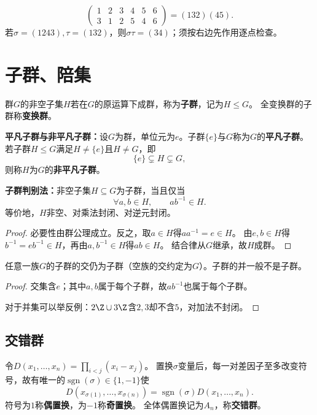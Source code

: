 \begin{example}
\[
\begin{pmatrix}1&2&3&4&5&6\\3&1&2&5&4&6\end{pmatrix}=(132)(45).
\]
若$\sigma=(1243),\tau=(132)$，则$\sigma\tau=(34)$；须按右边先作用逐点检查。
\end{example}

\section{子群、陪集}


\begin{definition}
群$G$的非空子集$H$若在$G$的原运算下成群，称为\textbf{子群}，记为$H\leq G$。
全变换群的子群称\textbf{变换群}。
\end{definition}

\begin{definition}
\textbf{平凡子群与非平凡子群：}设$G$为群，单位元为$e$。子群$\{e\}$与$G$称为$G$的\textbf{平凡子群}。
若子群$H\leq G$满足$H\neq\{e\}$且$H\neq G$，即
\[
\{e\}\subsetneq H\subsetneq G,
\]
则称$H$为$G$的\textbf{非平凡子群}。
\end{definition}

\begin{theorem}
\textbf{子群判别法：}非空子集$H\subseteq G$为子群，当且仅当
\[
\forall a,b\in H,\qquad ab^{-1}\in H.
\]
等价地，$H$非空、对乘法封闭、对逆元封闭。
\end{theorem}
\begin{proof}
必要性由群公理成立。反之，取$a\in H$得$aa^{-1}=e\in H$。
由$e,b\in H$得$b^{-1}=eb^{-1}\in H$，再由$a,b^{-1}\in H$得$ab\in H$。
结合律从$G$继承，故$H$成群。
\end{proof}

\begin{proposition}
任意一族$G$的子群的交仍为子群（空族的交约定为$G$）。子群的并一般不是子群。
\end{proposition}
\begin{proof}
交集含$e$；其中$a,b$属于每个子群，故$ab^{-1}$也属于每个子群。

对于并集可以举反例：$2\Z\cup3\Z$含$2,3$却不含$5$，对加法不封闭。
\end{proof}

\subsection*{交错群}
\begin{definition}
令$D(x_1,\ldots,x_n)=\prod_{i<j}(x_i-x_j)$。
置换$\sigma$变量后，每一对差因子至多改变符号，故有唯一的$\operatorname{sgn}(\sigma)\in\{1,-1\}$使
\[
D(x_{\sigma(1)},\ldots,x_{\sigma(n)})=\operatorname{sgn}(\sigma)D(x_1,\ldots,x_n).
\]
符号为$1$称\textbf{偶置换}，为$-1$称\textbf{奇置换}。
全体偶置换记为$A_n$，称\textbf{交错群}。
\end{definition}

